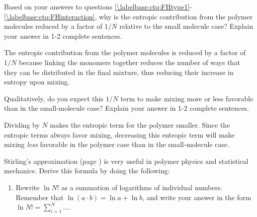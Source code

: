 \begin{activity}
\begin{infobox}
\end{infobox}

\begin{ctqs}

		\question Based on your answers to questions \ref{\labelbase:ctq:FHtype1}-\ref{\labelbase:ctq:FHinteraction}, why is the entropic contribution from the polymer molecules reduced by a factor of $1/N$ relative to the small molecule case? Explain your answer in 1-2 complete sentences.
		
			\begin{solution}[1.75in]
			
				The entropic contribution from the polymer molecules is reduced by a factor of $1/N$ because linking the monomers together reduces the number of ways that they can be distributed in the final mixture, thus reducing their increase in entropy upon mixing.
			
			\end{solution}
		
		\question Qualitatively, do you expect this $1/N$ term to make mixing more or less favorable than in the small-molecule case?  Explain your answer in 1-2 complete sentences.
		
			\begin{solution}[2in]
			
				Dividing by $N$ makes the entropic term for the polymer smaller.  Since the entropic terms always favor mixing, decreasing this entropic term will make mixing \emph{less} favorable in the polymer case than in the small-molecule case.
			
			\end{solution}
			
\end{ctqs}

\begin{exercises}

		\exercise Stirling's approximation (page \pageref{eqn:stirling}) is very useful in polymer physics and statistical mechanics.  Derive this formula by doing the following:
			\begin{enumerate}
				\item Rewrite $\ln N!$ as a summation of logarithms of individual numbers.  Remember that $\ln (a\cdot b) = \ln a + \ln b$, and write your answer in the form $\ln N! = \sum_{i=1}^N \dots$.
				
					\begin{solution}\end{solution}
					

\end{enumerate}
\end{exercises}
\end{activity}
